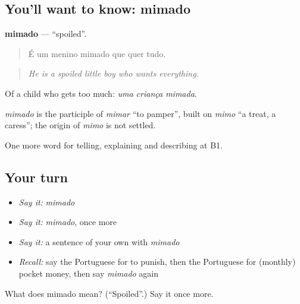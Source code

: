 \subsection*{You'll want to know: mimado}
\textbf{mimado} — \textquotedblleft{}spoiled\textquotedblright{}.

\begin{quote}
É um menino mimado que quer tudo.
\end{quote}

\begin{quote}
\emph{He is a spoiled little boy who wants everything.}
\end{quote}

Of a child who gets too much: \emph{uma criança mimada}.

\begin{cousinweb}
\emph{mimado} is the participle of \emph{mimar} \textquotedblleft{}to pamper\textquotedblright{}, built on \emph{mimo} \textquotedblleft{}a treat, a caress\textquotedblright{}; the origin of \emph{mimo} is not settled.
\end{cousinweb}

\begin{grammarlens}[title={What you've built}]
One more word for telling, explaining and describing at B1.
\end{grammarlens}

\subsection*{Your turn}
\begin{itemize}
\raggedright
  \item \emph{Say it:} \emph{mimado}
  \item \emph{Say it:} \emph{mimado}, once more
  \item \emph{Say it:} a sentence of your own with \emph{mimado}
  \item \emph{Recall:} say the Portuguese for to punish, then the Portuguese for (monthly) pocket money, then say \emph{mimado} again
\end{itemize}

\begin{tcolorbox}[breakable,colback=teal!4,colframe=teal!35!black,title={Before you move on}]
What does mimado mean? (\textquotedblleft{}Spoiled\textquotedblright{}.) Say it once more.
\end{tcolorbox}
